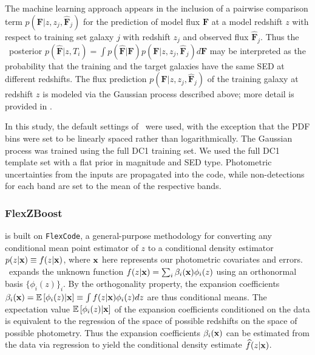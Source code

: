 The machine learning approach appears in the inclusion of a pairwise comparison term $p(\mathbf{F} \vert z, z_j, \mathbf{\hat{F}}_j)$ for the prediction of model flux $\mathbf{F}$ at a model redshift $z$ with respect to training set galaxy $j$ with redshift $z_j$ and observed flux $\mathbf{\hat{F}}_j$.
Thus the \pz\ posterior $p(\mathbf{\hat{F}} \vert z, T_i) = \int p(\mathbf{\hat{F}} \vert \mathbf{F}) p(\mathbf{F} \vert z, z_j, \mathbf{\hat{F}}_j) d\mathbf{F}$ may be interpreted as the probability that the training and the target galaxies have the same SED at different redshifts.
The flux prediction $p(\mathbf{F} \vert z, z_j, \mathbf{\hat{F}}_j)$ of the training galaxy at redshift $z$ is modeled via the Gaussian process described above; more detail is provided in \citet{Leistedt:17}.

In this study, the default settings of \delight\ were used, with the exception that the PDF bins were set to be linearly spaced rather than logarithmically.
The Gaussian process was trained using the full DC1 training set.
We used the full DC1 template set with a flat prior in magnitude and SED type.
Photometric uncertainties from the inputs are propagated into the code, while non-detections for each band are set to the mean of the respective bands.

\subsubsection{FlexZBoost}
\label{sec:flexzboost}

\flexzboost \citep{Izbicki:17,Dalmasso:2019} is built on \texttt{FlexCode}, a general-purpose methodology for converting any conditional mean point estimator of $z$ to a conditional density estimator $p(z \vert {\mathbf{x}}) \equiv f(z \vert {\mathbf{x}})$, where ${\mathbf{x}}$ here represents our photometric covariates and errors.
\flexzboost\ expands the unknown function $f(z \vert {\mathbf{x}}) = \sum_{i}\beta_{i}({\mathbf{x}})\phi_{i}(z)$ using an orthonormal basis $\{\phi_{i}(z)\}_{i}$.
By the orthogonality property, the expansion coefficients $\beta_{i}({\mathbf{x}}) = \mathbb{E}\left[\phi_i(z)|{\mathbf{x}}\right] \equiv \int f(z \vert {\mathbf{x}}) \phi_{i}(z) dz$ are thus conditional means.
The expectation value $\mathbb{E}\left[\phi_i(z) \vert {\mathbf{x}}\right]$ of the expansion coefficients conditioned on the data is equivalent to the regression of the space of possible redshifts on the space of possible photometry.
Thus the expansion coefficients $\beta_{i}({\mathbf{x}})$ can be estimated from the data via regression to yield the conditional density estimate $\widehat{f}(z \vert {\mathbf{x}})$.

